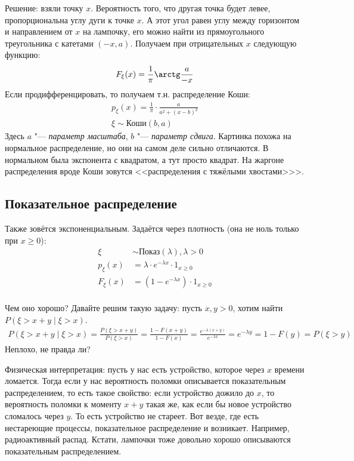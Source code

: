 Решение: взяли точку $x$.
Вероятность того, что другая точка будет левее, пропорциональна углу дуги к точке $x$.
А этот угол равен углу между горизонтом и направлением от $x$ на лампочку, его можно найти из прямоугольного
треугольника с катетами $(-x, a)$.
Получаем при отрицательных $x$ следующую функцию:
\[ F_{\xi}(x) = \frac{1}{\pi} \arctg \frac{a}{-x} \]
Если продифференцировать, то получаем т.н. распределение Коши:
\begin{gather*}
	p_{\xi}(x) = \frac{1}{\pi} \cdot \frac{a}{a^2+(x-b)^2} \\
	\xi \sim \text{Коши}(b, a)
\end{gather*}
Здесь $a$ "--- \textit{параметр масштаба}, $b$ "--- \textit{параметр сдвига}.
Картинка похожа на нормальное распределение, но они на самом деле сильно отличаются.
В нормальном была экспонента с квадратом, а тут просто квадрат.
На жаргоне распределения вроде Коши зовутся <<распределения с тяжёлыми хвостами>>>.


\subsection{Показательное распределение}
Также зовётся экспоненциальным.
Задаётся через плотность (она не ноль только при $x \ge 0$):
\begin{align*}
	\xi &\sim \text{Показ}(\lambda), \lambda > 0 \\
	p_{\xi}(x) &= \lambda \cdot e^{-\lambda x} \cdot \mathrm{1}_{x \ge 0} \\
	F_{\xi}(x) &= (1 - e^{-\lambda x}) \cdot \mathrm{1}_{x \ge 0} \\
\end{align*}

Чем оно хорошо?
Давайте решим такую задачу: пусть $x, y > 0$, хотим найти $P(\xi > x + y \mid \xi > x)$.
\begin{gather*}
	P(\xi > x + y \mid \xi > x) =
	\frac{P(\xi > x + y)}{P(\xi > x)} =
	\frac{1 - F(x+y)}{1-F(x)} =
	\frac{e^{-\lambda(x+y)}}{e^{-\lambda x}}  =
	e^{-\lambda y} =
	1 - F(y) =
	P(\xi > y)
\end{gather*}
Неплохо, не правда ли?

Физическая интерпретация: пусть у нас есть устройство, которое через $x$ времени ломается.
Тогда если у нас вероятность поломки описывается показательным распределением, то есть
такое свойство: если устройство дожило до $x$, то вероятность поломки к моменту $x+y$ такая же,
как если бы новое устройство сломалось через $y$.
То есть устройство не стареет.
Вот везде, где есть нестареющие процессы, показательное распределение и возникает.
Например, радиоактивный распад.
Кстати, лампочки тоже довольно хорошо описываются показательным распределением.

